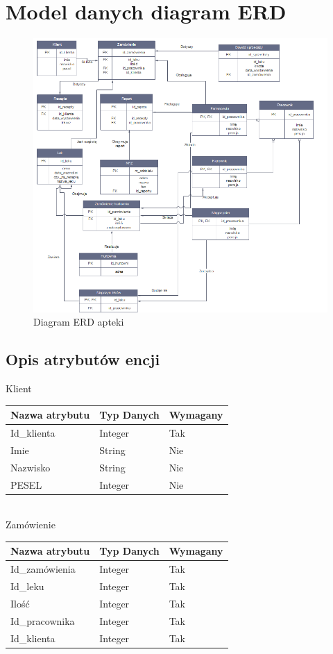\documentclass[a4paper, 11pt]{article}
\begin{document}
	
	\section{Model danych diagram ERD}
	
			\begin{figure}[H]
			\centerline{\includegraphics[scale=1]{ERD.png}}
			\caption{Diagram ERD apteki}
			\end{figure}
	\subsection{Opis atrybutów encji}
 Klient\\
\begin{tabular}{|l|l|l|} \hline
Nazwa  atrybutu	& Typ Danych	& Wymagany \\ \hline
Id\_klienta	& Integer	& Tak \\ \hline
Imie & 	String	& Nie \\ \hline
Nazwisko & String &	Nie \\ \hline
PESEL 	& 	Integer	& Nie \\ \hline
\end{tabular}\\[1cm]

Zamówienie\\
\begin{tabular}{|l|l|l|} \hline
Nazwa  atrybutu	& Typ Danych	& Wymagany \\ \hline
Id\_zamówienia	 &Integer	& Tak \\ \hline
Id\_leku &	Integer	& Tak\\ \hline
Ilość	& Integer	& Tak\\ \hline
Id\_pracownika &	Integer	& Tak\\ \hline
Id\_klienta &	Integer &	Tak\\ \hline
\end{tabular}\\[1cm]
	
\end{document}
